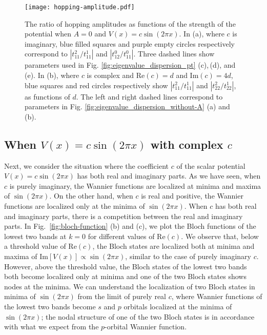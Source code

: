 \documentclass[prb,superscriptaddress,floatfix,twocolumn,showpacs]{revtex4-2}
\begin{document}
\begin{figure}[tbp]
    \centering
    \texttt{[image: hopping-amplitude.pdf]}
    \caption{The ratio of hopping amplitudes as functions of the strength of the potential when $A=0$ and $V(x) = c\sin (2\pi x)$. 
    In (a), where $c$ is imaginary, blue filled squares and purple empty circles respectively correspond to $|t_{11}^2/t_{11}^1|$ and $|t_{12}^0/t_{11}^0|$. 
    Three dashed lines show parameters used in Fig. \ref{fig:eigenvalue_dispersion_pt} (c),\,(d), and (e). 
    In (b), where $c$ is complex and Re$(c)=d$ and Im$(c)=4d$, blue squares and red circles respectively show $|t_{11}^2/t_{11}^1|$ and $|t_{22}^2/t_{22}^1|$, as functions of $d$.  
    The left and right dashed lines correspond to parameters in Fig. \ref{fig:eigenvalue_dispersion_without-A} (a) and (b).}
    \label{fig:hopping-amplitude}
\end{figure}

\subsection{When $V(x) = c \sin (2\pi x)$ with complex $c$}
\label{subsec:complex-potential_without-A}
Next, we consider the situation where the coefficient $c$ of the scalar potential $V(x) = c \sin (2\pi x)$ has both real and imaginary parts. 
As we have seen, when $c$ is purely imaginary, the Wannier functions are localized at minima and maxima of $\sin (2\pi x)$. 
On the other hand, when $c$ is real and positive, the Wannier functions are localized only at the minima of $\sin (2\pi x)$. When $c$ has both real and imaginary parts, there is a competition between the real and imaginary parts. 
In Fig.~\ref{fig:bloch-function} (b) and (c), we plot the Bloch functions of the lowest two bands at $k = 0$ for different values of $\mathrm{Re}(c)$. 
We observe that, below a threshold value of $\mathrm{Re}(c)$, the Bloch states are localized both at minima and maxima of $\mathrm{Im}[V(x)]\propto\sin (2\pi x)$, similar to the case of purely imaginary $c$. 
However, above the threshold value, the Bloch states of the lowest two bands both become localized only at minima and one of the two Bloch states shows nodes at the minima. 
We can understand the localization of two Bloch states in minima of $\sin (2\pi x)$ from the limit of purely real $c$, where Wannier functions of the lowest two bands become $s$ and $p$ orbitals localized at the minima of $\sin (2\pi x)$; the nodal structure of one of the two Bloch states is in accordance with what we expect from the $p$-orbital Wannier function.
\end{document}
